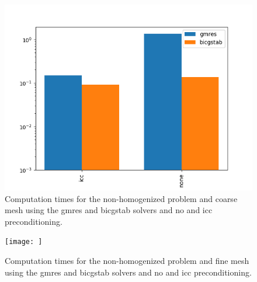 \documentclass{article}
\begin{document}
\begin{figure}[h]
    \centering
    \includegraphics[width=0.8\linewidth]{solution_times_icc_big_h.png}
    \caption{Computation times for the non-homogenized problem and coarse mesh using the gmres and bicgstab solvers and no and icc preconditioning.}
    \label{fig:solution_times_icc_big_h}
  \end{figure}
  \begin{figure}[h]
    \centering
    \texttt{[image: ]}%
    \caption{Computation times for the non-homogenized problem and fine mesh using the gmres and bicgstab solvers and no and icc preconditioning.}
    \label{fig:solution_times_icc_small_h}
  \end{figure}
  
\end{document}
